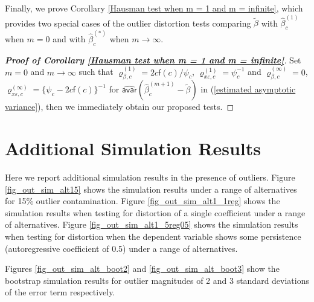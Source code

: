 \documentclass[11pt, letterpaper]{article}
\numberwithin{algorithm}{section}
\numberwithin{assumption}{section}
\numberwithin{lemma}{section}
\numberwithin{theorem}{section}
\numberwithin{corollary}{section}
\numberwithin{remark}{section}
\numberwithin{equation}{section}
\numberwithin{figure}{section}
\numberwithin{table}{section}
\newcommand{\ignore}[1]{}
\begin{document}
Finally, we prove Corollary \ref{Hausman test when m = 1 and m = infinite}, which provides two special cases of the outlier distortion tests comparing $\widetilde{\beta}$ with $\widehat{\beta}_{c}^{(1)}$ when $m = 0$ and with $\widehat{\beta}_{c}^{(\ast)}$ when $m \to \infty$.

\begin{proof}[\textnormal{\textbf{Proof of Corollary \ref{Hausman test when m = 1 and m = infinite}}}]
Set $m = 0$ and $m \to \infty$ such that $\varrho_{\beta, c}^{(1)} = 2 c \mathsf{f}(c) / \psi_{c}$, $\varrho_{x \varepsilon, c}^{(1)} = \psi_{c}^{-1}$ and $\varrho_{\beta, c}^{(\infty)} = 0$, $\varrho_{x \varepsilon, c}^{(\infty)} = \{ \psi_{c} - 2 c \mathsf{f}(c) \}^{-1}$ for $\widehat{\mathsf{avar}}(\widehat{\beta}_{c}^{(m + 1)} - \widetilde{\beta})$ in (\ref{estimated asymptotic variance}), then we immediately obtain our proposed tests.
\end{proof}

\clearpage
\section{Additional Simulation Results} \label{sec_add_sim}

Here we report additional simulation results in the presence of outliers. Figure \ref{fig_out_sim_alt15} shows the simulation results under a range of alternatives for 15\% outlier contamination. Figure \ref{fig_out_sim_alt1_1reg} shows the simulation results when testing for distortion of a single coefficient under a range of alternatives. Figure \ref{fig_out_sim_alt1_5reg05} shows the simulation results when testing for distortion when the dependent variable shows some persistence (autoregressive coefficient of 0.5) under a range of alternatives. %


Figures \ref{fig_out_sim_alt_boot2} and \ref{fig_out_sim_alt_boot3} show the bootstrap simulation results for outlier magnitudes of 2 and 3 standard deviations of the error term respectively.
\end{document}
